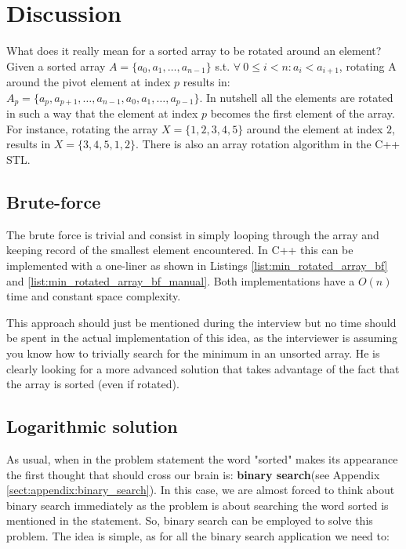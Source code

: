 \section{Discussion}
\label{min_rotated_array:sec:discussion}
What does it really mean for a sorted array to be rotated around an element? Given a sorted array $A=\{a_0, a_1, \ldots,a_{n-1}\}$ s.t. $ \forall \: 0 \leq i < n: a_i < a_{i+1}$, rotating A around the pivot element at index $p$ results in: $A_p=\{a_p, a_{p+1}, \ldots,a_{n-1}, a_0, a_1, \ldots, a_{p-1}\}$. In  nutshell all the elements are rotated in such a way that the element at index $p$ becomes the first element of the array. For instance, rotating the array $X=\{1,2,3,4,5\}$ around the element at index $2$, results in $X=\{3,4,5,1,2\}$.  There is also an array rotation algorithm in the C++ STL\cite{cit::std::rotate}.


\subsection{Brute-force}
\label{min_rotated_array:sec:bruteforce}
The brute force is trivial and consist in simply looping through the array and keeping record of the smallest element encountered. In C++ this can be implemented with a one-liner as shown in Listings \ref{list:min_rotated_array_bf} and \ref{list:min_rotated_array_bf_manual}.
Both implementations have a $O(n)$ time and constant space complexity.





This approach should just be mentioned during the interview but no time should be spent in the actual implementation of this idea, as the interviewer is assuming you know how to trivially search for the minimum in an unsorted array. He is clearly looking for a more advanced solution that takes advantage of the fact that the array is sorted (even if rotated).

\subsection{Logarithmic solution}
\label{min_rotated_array:sec:log}
As usual, when in the problem statement the word "sorted" makes its appearance the first thought that should cross our brain is: \textbf{binary search}(see Appendix \ref{sect:appendix:binary_search}). In this case, we are almost forced to think about binary search immediately as the problem is about searching the word sorted is mentioned in the statement. So, binary search can be employed to solve this problem. The idea is simple, as for all the binary search application we need to:

